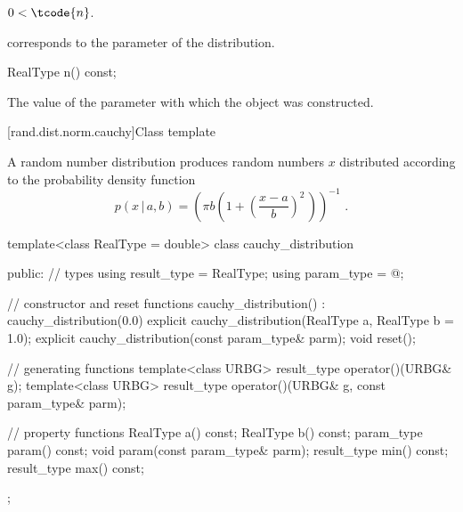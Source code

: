 \begin{itemdescr}
\pnum
\expects
$0 < \tcode{n}$.

\pnum
\remarks
{} corresponds to the parameter of the distribution.
\end{itemdescr}

\begin{indexed}{}
\begin{itemdecl}
RealType n() const;
\end{itemdecl}
\end{indexed}

\begin{itemdescr}
\pnum
\returns
The value of the  parameter
 with which the object was constructed.
\end{itemdescr}


[rand.dist.norm.cauchy]{Class template }%
%
%

\pnum
A  random number distribution
produces random numbers $x$
distributed according to
the probability density function%
%
%
\[  p(x\,|\,a,b) = \left(\pi b \left(1 + \left(\frac{x-a}{b} \right)^2 \, \right)\right)^{-1} \text{ .} \]

%
%
\begin{codeblock}
template<class RealType = double>
  class cauchy_distribution {
  public:
    // types
    using result_type = RealType;
    using param_type  = @\unspec@;

    // constructor and reset functions
    cauchy_distribution() : cauchy_distribution(0.0) {}
    explicit cauchy_distribution(RealType a, RealType b = 1.0);
    explicit cauchy_distribution(const param_type& parm);
    void reset();

    // generating functions
    template<class URBG>
      result_type operator()(URBG& g);
    template<class URBG>
      result_type operator()(URBG& g, const param_type& parm);

    // property functions
    RealType a() const;
    RealType b() const;
    param_type param() const;
    void param(const param_type& parm);
    result_type min() const;
    result_type max() const;
  };
\end{codeblock}


